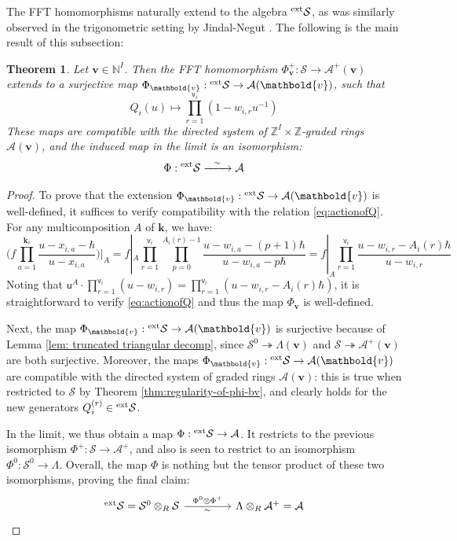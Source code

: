 \documentclass[11pt,reqno]{amsart}
\renewcommand{\mathbf}{\mathbold}
\numberwithin{equation}{section}
\newtheorem{Theorem}[equation]{Theorem}
\theoremstyle{definition}
\newcommand{\cA}{\mathcal{A}}
\newcommand{\cS}{\mathcal{S}}
\newcommand{\bk}{\mathbf{k}}
\newcommand{\bv}{\mathbf{v}}
\newcommand{\NN}{\mathbb{N}}
\newcommand{\ZZ}{\mathbb{Z}}
\newcommand{\leftexp}[2]{\vphantom{#2}^{#1} #2}
\renewcommand{\bv}{\mathbf{v}} %
\newcommand{\sv}{\mathsf{v}}
\newcommand{\sfu}{\mathsf{u}}
\newcommand{\vertexset}{I}
\newcommand{\GT}{\Lambda}
\newcommand{\base}{R}
\newcommand{\qzast}{\cA}
\newcommand{\qzastplus}{\cA^{+}}
\newcommand{\shu}{\cS}
\newcommand{\extshu}{\leftexp{\mathrm{ext}}{\cS}}
\newcommand{\shuzero}{\cS^0}
\newcommand{\Qvar}{Q}
\begin{document}
The FFT homomorphisms naturally extend to the algebra $\extshu$, as was similarly observed  in the trigonometric setting by Jindal-Negut \cite[\S 4.2]{JN26}.  The following is the main result of this subsection:
\begin{Theorem}
    \label{thm:isoextshu}
    Let $\bv \in \NN^\vertexset$.  Then the FFT homomorphism $\Phi^+_\bv: \shu \rightarrow \qzastplus(\bv)$ extends to a surjective map $\Phi_\bv: \extshu \rightarrow \qzast(\bv)$, such that 
    $$
    \Qvar_i(u) \longmapsto \prod_{r=1}^{\sv_i} ( 1 -w_{i,r} u^{-1}) 
    $$
    These maps are compatible with the directed system of $\ZZ^\vertexset\times\ZZ$-graded rings $\qzast(\bv)$, and the induced map in the limit is an isomorphism:
    $$\Phi : \extshu \xrightarrow{\ \ \sim \ \ } \qzast$$
\end{Theorem}
\begin{proof}
    To prove that the extension $\Phi_\bv: \extshu \rightarrow \qzast(\bv)$ is well-defined, it suffices to verify compatibility with the relation \eqref{eq:actionofQ}. For any multicomposition $A$ of $\bk$, we have:
    $$
    \Big(f\prod_{a=1}^{\bk_i} \frac{u-x_{i,a} - \hbar}{u-x_{i,a}} \Big)\Bigg|_A = f|_A \prod_{r = 1}^{\sv_i} \prod_{p=0}^{A_i(r)-1} \frac{u-w_{i,a}-(p+1)\hbar}{u-w_{i,a}-p\hbar} = f|_A \prod_{r=1}^{\sv_i}\frac{u-w_{i,r} - A_i(r) \hbar}{u-w_{i,r}}
    $$
    Noting  that $\sfu^A \cdot \prod_{r=1}^{\sv_i}(u-w_{i,r})  = \prod_{r=1}^{\sv_i}(u-w_{i,r} - A_i(r)\hbar)$, it is straightforward to verify \eqref{eq:actionofQ} and thus the map $\Phi_\bv$ is well-defined.

    Next, the map $\Phi_\bv : \extshu \rightarrow \qzast(\bv)$ is surjective because of Lemma \ref{lem: truncated triangular decomp}, since $\shuzero \twoheadrightarrow \GT(\bv)$ and $\shu \twoheadrightarrow \qzastplus(\bv)$ are both surjective.    Moreover, the maps $\Phi_\bv: \extshu \rightarrow \qzast(\bv)$ are compatible with the directed system of graded rings $\qzast(\bv)$: this is true when restricted to $\shu$ by Theorem \ref{thm:regularity-of-phi-bv}, and clearly holds for the new generators $\Qvar_i^{(r)} \in \extshu$.  

    In the limit, we thus obtain a map $\Phi: \extshu \rightarrow \qzast$.  It restricts to the previous isomorphism $\Phi^+:\shu \rightarrow \qzastplus$, and also is seen to restrict to an isomorphism $\Phi^0:\shuzero \rightarrow \GT$.  Overall, the map $\Phi$ is nothing but the tensor product of these two isomorphisms, proving the final claim:
    $$
    \begin{tikzcd}[column sep = 1.5cm]
        \extshu = \shuzero \otimes_\base \shu \ar[r,"\Phi^0 \otimes \Phi^+","\sim"'] & \GT \otimes_\base \qzastplus = \qzast
    \end{tikzcd}
    $$

    
\end{proof}
\end{document}
